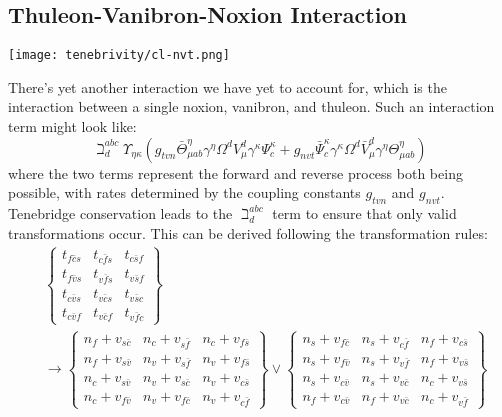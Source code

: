 \subsection{Thuleon-Vanibron-Noxion Interaction}
\begin{center}
  \texttt{[image: tenebrivity/cl-nvt.png]}
\end{center}
There's yet another interaction we have yet to account for, which is the interaction between a single noxion, vanibron, and thuleon. Such an interaction term might look like:
\[
  \beth^{a b c}_{d} \Upsilon_{\eta \kappa} \left(
  g_{tvn}
  \bar{\Theta}^{\eta}_{\mu a b}
  \gamma^{\eta}
  \Omega^{d}
  V^{d}_{\mu}
  \gamma^{\kappa}
  \Psi^{\kappa}_{c}
  +
  g_{nvt}
  \bar{\Psi}^{\kappa}_{c}
  \gamma^{\kappa}
  \Omega^{d}
  \bar{V}^{d}_{\mu}
  \gamma^{\eta}
  \Theta^{\eta}_{\mu a b}
  \right)
\]
where the two terms represent the forward and reverse process both being possible, with rates determined by the coupling constants \(g_{tvn}\) and \(g_{nvt}\). Tenebridge conservation leads to the \(\beth^{a b c}_{d}\) term to ensure that only valid transformations occur. This can be derived following the transformation rules:
\begin{align*}
   & \begin{Bmatrix}
       t_{f \bar{c} s} & t_{c \bar{f} s} & t_{c \bar{s} f} \\
       t_{f \bar{v} s} & t_{v \bar{f} s} & t_{v \bar{s} f} \\
       t_{c \bar{v} s} & t_{v \bar{c} s} & t_{v \bar{s} c} \\
       t_{c \bar{v} f} & t_{v \bar{c} f} & t_{v \bar{f} c}
     \end{Bmatrix} \\
   & \longrightarrow
  \begin{Bmatrix}
    n_{f} + v_{s \bar{c}} & n_{c} + v_{s \bar{f}} & n_{c} + v_{f \bar{s}} \\
    n_{f} + v_{s \bar{v}} & n_{v} + v_{s \bar{f}} & n_{v} + v_{f \bar{s}} \\
    n_{c} + v_{s \bar{v}} & n_{v} + v_{s \bar{c}} & n_{v} + v_{c \bar{s}} \\
    n_{c} + v_{f \bar{v}} & n_{v} + v_{f \bar{c}} & n_{v} + v_{c \bar{f}}
  \end{Bmatrix} \lor
  \begin{Bmatrix}
    n_{s} + v_{f \bar{c}} & n_{s} + v_{c \bar{f}} & n_{f} + v_{c \bar{s}} \\
    n_{s} + v_{f \bar{v}} & n_{s} + v_{v \bar{f}} & n_{f} + v_{v \bar{s}} \\
    n_{s} + v_{c \bar{v}} & n_{s} + v_{v \bar{c}} & n_{c} + v_{v \bar{s}} \\
    n_{f} + v_{c \bar{v}} & n_{f} + v_{v \bar{c}} & n_{c} + v_{v \bar{f}}
  \end{Bmatrix}
\end{align*}

